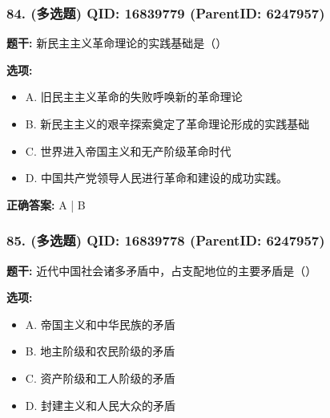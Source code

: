 \documentclass[12pt,UTF8]{ctexart}
\begin{document}
\vspace{0.3em}\hrulefill\vspace{0.7em}

\subsubsection*{84. (多选题) \small QID: 16839779 (ParentID: 6247957)}

\textbf{题干:}
新民主主义革命理论的实践基础是（）



\textbf{选项:}
\begin{itemize}[leftmargin=*]

  \item A. 旧民主主义革命的失败呼唤新的革命理论

  \item B. 新民主主义的艰辛探索奠定了革命理论形成的实践基础

  \item C. 世界进入帝国主义和无产阶级革命时代

  \item D. 中国共产党领导人民进行革命和建设的成功实践。

\end{itemize}

\textbf{正确答案:}
A | B

\vspace{0.3em}\hrulefill\vspace{0.7em}

\subsubsection*{85. (多选题) \small QID: 16839778 (ParentID: 6247957)}

\textbf{题干:}
近代中国社会诸多矛盾中，占支配地位的主要矛盾是（）



\textbf{选项:}
\begin{itemize}[leftmargin=*]

  \item A. 帝国主义和中华民族的矛盾

  \item B. 地主阶级和农民阶级的矛盾

  \item C. 资产阶级和工人阶级的矛盾

  \item D. 封建主义和人民大众的矛盾

\end{itemize}
\end{document}
